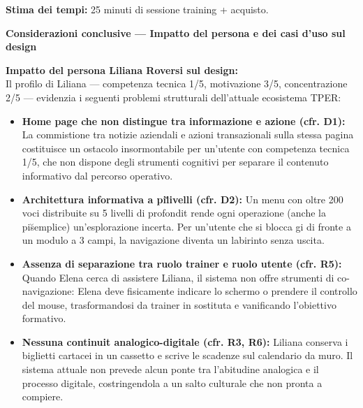\documentclass[11pt,a4paper]{article}
\begin{document}
\begin{tcolorbox}[colback=backgroundColor,colframe=borderColor,arc=2mm]
{    \textbf{Stima dei tempi:} 25 minuti di sessione training + acquisto.
    }
\end{tcolorbox}

\newpage

% 


\begin{tcolorbox}[colback=primaryColor!10,colframe=primaryColor,arc=2mm]
    \textbf{Considerazioni conclusive --- Impatto del persona e dei casi d'uso sul design}
\end{tcolorbox}

\vspace{0.3cm}

\begin{tcolorbox}[colback=backgroundColor,colframe=borderColor,arc=2mm]
    {\small
    \textbf{Impatto del persona Liliana Roversi sul design:} \\[4pt]
    Il profilo di Liliana --- competenza tecnica 1/5, motivazione 3/5, concentrazione 2/5 --- evidenzia i seguenti problemi strutturali dell'attuale ecosistema TPER:
    \begin{itemize}[leftmargin=*]
        \item \textbf{Home page che non distingue tra informazione e azione (cfr. D1):} La commistione tra notizie aziendali e azioni transazionali sulla stessa pagina costituisce un ostacolo insormontabile per un'utente con competenza tecnica 1/5, che non dispone degli strumenti cognitivi per separare il contenuto informativo dal percorso operativo.
        \item \textbf{Architettura informativa a pi\u livelli (cfr. D2):} Un menu con oltre 200 voci distribuite su 5 livelli di profondit\ rende ogni operazione (anche la pi\u semplice) un'esplorazione incerta. Per un'utente che si blocca gi\ di fronte a un modulo a 3 campi, la navigazione diventa un labirinto senza uscita.
        \item \textbf{Assenza di separazione tra ruolo trainer e ruolo utente (cfr. R5):} Quando Elena cerca di assistere Liliana, il sistema non offre strumenti di co-navigazione: Elena deve fisicamente indicare lo schermo o prendere il controllo del mouse, trasformandosi da trainer in sostituta e vanificando l'obiettivo formativo.
        \item \textbf{Nessuna continuit\ analogico-digitale (cfr. R3, R6):} Liliana conserva i biglietti cartacei in un cassetto e scrive le scadenze sul calendario da muro. Il sistema attuale non prevede alcun ponte tra l'abitudine analogica e il processo digitale, costringendola a un salto culturale che non \e pronta a compiere.
    \end{itemize}
    }
\end{tcolorbox}
\end{document}
